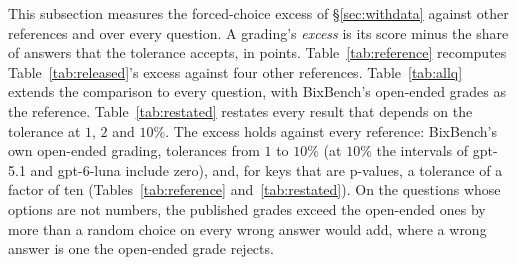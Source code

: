 \documentclass{article}
\begin{document}
This subsection measures the forced-choice excess of \S\ref{sec:withdata} against other references and over every
question. A grading's \emph{excess} is its score minus the share of answers that the tolerance accepts, in points.
Table~\ref{tab:reference} recomputes Table~\ref{tab:released}'s excess against four other references.
Table~\ref{tab:allq} extends the comparison to every question, with BixBench's open-ended grades as the reference.
Table~\ref{tab:restated} restates every result that depends on the tolerance at $1$, $2$ and $10\%$. The excess
holds against every reference: BixBench's own open-ended grading, tolerances from $1$ to $10\%$ (at $10\%$ the
intervals of gpt-5.1 and gpt-6-luna include zero), and, for keys that are p-values, a tolerance of a factor of ten
(Tables~\ref{tab:reference} and~\ref{tab:restated}). On the questions
whose options are not numbers, the published grades exceed the open-ended ones by more than a random choice on every
wrong answer would add, where a wrong answer is one the open-ended grade rejects.
\end{document}
